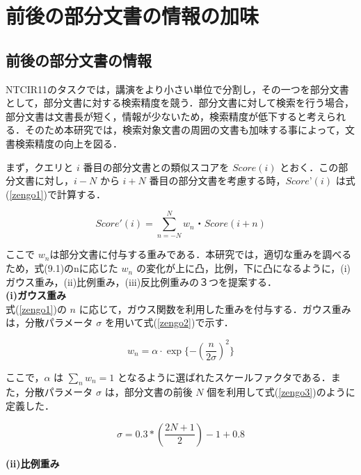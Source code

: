 \chapter{前後の部分文書の情報の加味}

\section{前後の部分文書の情報}
NTCIR11のタスクでは，講演をより小さい単位で分割し，その一つを部分文書として，部分文書に対する検索精度を競う．部分文書に対して検索を行う場合，部分文書は文書長が短く，情報が少ないため，検索精度が低下すると考えられる．そのため本研究では，検索対象文書の周囲の文書も加味する事によって，文書検索精度の向上を図る．


まず，クエリと $i$ 番目の部分文書との類似スコアを $Score(i)$ とおく．この部分文書に対し，$i-N$ から $i+N$ 番目の部分文書を考慮する時，$ Score’(i)$ は式(\ref{zengo1})で計算する．

\begin{equation}
    Score'(i) = \sum_{n=-N}^N w_n・Score(i + n) 
    \label{zengo1}
\end{equation}

ここで $w_n$は部分文書に付与する重みである．本研究では，適切な重みを調べるため，式(9.1)のnに応じた $w_n$ の変化が上に凸，比例，下に凸になるように，(i)ガウス重み，(ii)比例重み，(iii)反比例重みの３つを提案する．\\

{\bf(i)ガウス重み} \\

式(\ref{zengo1})の $n$ に応じて，ガウス関数を利用した重みを付与する．ガウス重みは，分散パラメータ $\sigma$ を用いて式(\ref{zengo2})で示す．

\begin{equation}
    w_n = \alpha⋅\exp⁡\{-(\frac{n}{2\sigma})^2\}
    \label{zengo2}
\end{equation}

ここで，$\alpha$ は $\sum_n w_n = 1$ となるように選ばれたスケールファクタである．また，分散パラメータ $\sigma$ は，部分文書の前後 $N$ 個を利用して式(\ref{zengo3})のように定義した．

\begin{equation}
    \sigma = 0.3 * (\frac{2N+1}{2}) - 1 + 0.8
    \label{zengo3}
\end{equation}

{\bf(ii)比例重み} \\

